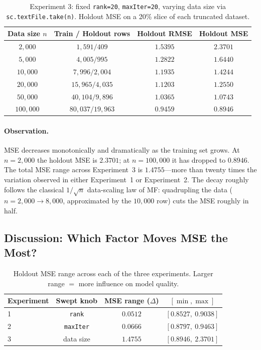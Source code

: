 \documentclass[12pt]{article}
\begin{document}
	\begin{table}[H]
		\centering
		\caption{Experiment 3: fixed \texttt{rank=20}, \texttt{maxIter=20}, varying data size via \texttt{sc.textFile.take(n)}. Holdout MSE on a 20\% slice of each truncated dataset.}\label{tab:exp3}
		\begin{tabular}{cccc}
			\toprule
			Data size $n$ & Train / Holdout rows & Holdout RMSE & Holdout MSE \\
			\midrule
			$2{,}000$   & $1{,}591 / 409$     & $1.5395$ & $2.3701$ \\
			$5{,}000$   & $4{,}005 / 995$     & $1.2822$ & $1.6440$ \\
			$10{,}000$  & $7{,}996 / 2{,}004$ & $1.1935$ & $1.4244$ \\
			$20{,}000$  & $15{,}965 / 4{,}035$ & $1.1203$ & $1.2550$ \\
			$50{,}000$  & $40{,}104 / 9{,}896$ & $1.0365$ & $1.0743$ \\
			$100{,}000$ & $80{,}037 / 19{,}963$ & $0.9459$ & $\mathbf{0.8946}$ \\
			\bottomrule
		\end{tabular}
	\end{table}

	\paragraph{Observation.} MSE decreases monotonically and dramatically as the training set grows. At $n=2{,}000$ the holdout MSE is $2.3701$; at $n=100{,}000$ it has dropped to $0.8946$. The total MSE range across Experiment~3 is $1.4755$---more than twenty times the variation observed in either Experiment~1 or Experiment~2. The decay roughly follows the classical $1/\sqrt{n}$ data-scaling law of MF: quadrupling the data ($n=2{,}000\rightarrow 8{,}000$, approximated by the $10{,}000$ row) cuts the MSE roughly in half.

	\subsection{Discussion: Which Factor Moves MSE the Most?}\label{sec:discussion}

	\begin{table}[H]
		\centering
		\caption{Holdout MSE range across each of the three experiments. Larger range $=$ more influence on model quality.}\label{tab:ranges}
		\begin{tabular}{lccc}
			\toprule
			Experiment & Swept knob & MSE range ($\Delta$) & $[\min,\max]$ \\
			\midrule
			1 & \texttt{rank}     & $0.0512$ & $[0.8527,\ 0.9038]$ \\
			2 & \texttt{maxIter}  & $0.0666$ & $[0.8797,\ 0.9463]$ \\
			3 & data size         & $\mathbf{1.4755}$ & $[0.8946,\ 2.3701]$ \\
			\bottomrule
		\end{tabular}
	\end{table}
\end{document}
